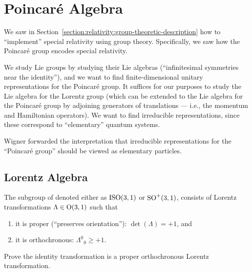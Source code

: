 \section{Poincar\'e Algebra}

We saw in Section~\ref{section:relativity:group-theoretic-description}
how to ``implement'' special relativity using group
theory. Specifically, we saw how the Poincar\'e group encodes special
relativity. 

We study Lie groups by studying their Lie algebras (``infinitesimal
symmetries near the identity''), and we want to find finite-dimensional
unitary representations for the Poincar\'e group. It suffices for our
purposes to study the Lie algebra for the Lorentz group (which can be
extended to the Lie algebra for the Poincar\'e group by adjoining
generators of translations --- i.e., the momentum and Hamiltonian
operators). We want to find irreducible representations, since these
correspond to ``elementary'' quantum systems.

Wigner forwarded the interpretation that irreducible representations for
the ``Poincar\'e group'' should be viewed as elementary
particles.

\subsection{Lorentz Algebra}

\begin{definition}
The subgroup of 
denoted either as $\mathrm{ISO}(3,1)$ or $\operatorname{SO}^{+}(3,1)$, consists of Lorentz
transformations $\Lambda\in\mathrm{O}(3,1)$ such that
\begin{enumerate}
\item it is proper (``preserves orientation''): $\det(\Lambda)=+1$, and
\item it is orthochronous: ${\Lambda^{0}}_{0}\geq+1$.
\end{enumerate}
\end{definition}
\begin{exercise}
Prove the identity transformation is a proper orthochronous Lorentz
transformation. 
\end{exercise}

